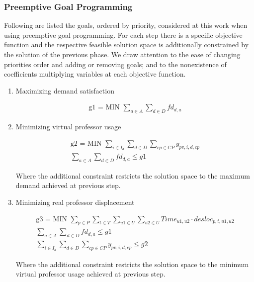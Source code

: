 \subsubsection{Preemptive Goal Programming}

Following are listed the goals, ordered by priority, considered at this work when using preemptive goal programming. For each step there is a specific objective function and the respective feasible solution space is additionally constrained by the solution of the previous phase. We draw attention to the ease of changing priorities order and adding or removing goals; and to the nonexistence of coefficients multiplying variables at each objective function.

\begin{enumerate}

\item{Maximizing demand satisfaction}

\begin{align*}
   \mbox{g1 = MIN  } \sum\limits_{a \in A}\sum\limits_{d \in D} fd_{d,a}
\end{align*}

\item{Minimizing virtual professor usage}

\begin{align*}
  \mbox{g2 = MIN  } \sum\limits_{i \in I_{d}} \sum\limits_{d \in D} \sum\limits_{cp \in CP} y_{pv,i,d,cp}
	\\
	\sum\limits_{a \in A}\sum\limits_{d \in D} fd_{d,a} \le g1
\end{align*}

Where the additional constraint restricts the solution space to the maximum demand achieved at previous step.

\item{Minimizing real professor displacement}

\begin{align*}
  \mbox{g3 = MIN  } \sum\limits_{p \in P} \sum\limits_{t \in T} \sum\limits_{u1 \in U} \sum\limits_{u2 \in U} Time_{u1,u2} \cdot desloc_{p,t,u1,u2}
	\\
	\sum\limits_{a \in A}\sum\limits_{d \in D} fd_{d,a} \le g1
	\\
	\sum\limits_{i \in I_{d}} \sum\limits_{d \in D} \sum\limits_{cp \in CP} y_{pv,i,d,cp} \le g2
\end{align*}

Where the additional constraint restricts the solution space to the minimum virtual professor usage achieved at previous step.


\end{enumerate}
